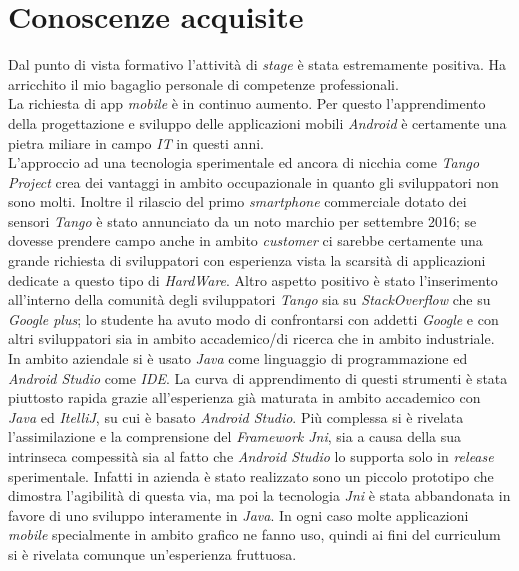 \section{Conoscenze acquisite}
Dal punto di vista formativo l'attività di \emph{stage} è stata estremamente positiva. Ha arricchito il mio bagaglio personale di competenze professionali.\\

La richiesta di app \emph{mobile} è in continuo aumento. Per questo l'apprendimento della progettazione e sviluppo delle applicazioni mobili \emph{Android} è certamente una pietra miliare in campo \emph{IT} in questi anni.\\

L'approccio ad una tecnologia sperimentale ed ancora di nicchia come \emph{Tango Project} crea dei vantaggi in ambito occupazionale in quanto gli sviluppatori non sono molti. Inoltre il rilascio del primo \emph{smartphone} commerciale dotato dei sensori \emph{Tango} è stato annunciato da un noto marchio per settembre 2016; se dovesse prendere campo anche in ambito \emph{customer} ci sarebbe certamente una grande richiesta di sviluppatori con esperienza vista la scarsità di applicazioni dedicate a questo tipo di \emph{HardWare}. Altro aspetto positivo è stato l'inserimento all'interno della comunità degli sviluppatori \emph{Tango} sia su \emph{StackOverflow} che su \emph{Google plus}; lo studente ha avuto modo di confrontarsi con addetti \emph{Google} e con altri sviluppatori sia in ambito accademico/di ricerca che in ambito industriale.\\

In ambito aziendale si è usato \emph{Java} come linguaggio di programmazione ed \emph{Android Studio} come \emph{IDE}. La curva di apprendimento di questi strumenti è stata piuttosto rapida grazie all'esperienza già maturata in ambito accademico con \emph{Java} ed \emph{ItelliJ}, su cui è basato \emph{Android Studio}. Più complessa si è rivelata l'assimilazione e la comprensione del \emph{Framework Jni}, sia a causa della sua intrinseca compessità sia al fatto che \emph{Android Studio} lo supporta solo in \emph{release} sperimentale. Infatti in azienda è stato realizzato sono un piccolo prototipo che dimostra l'agibilità di questa via, ma poi la tecnologia \emph{Jni} è stata abbandonata in favore di uno sviluppo interamente in \emph{Java}. In ogni caso molte applicazioni \emph{mobile} specialmente in ambito grafico ne fanno uso, quindi ai fini del curriculum si è rivelata comunque un'esperienza fruttuosa.\\

